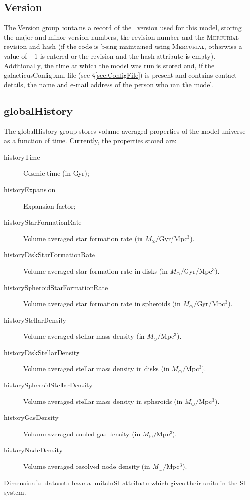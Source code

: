 \subsection{Version}

The {\normalfont \ttfamily Version} group contains a record of the \glc\ version used for this model, storing the major and minor version numbers, the revision number and the {\normalfont \scshape Mercurial} revision and hash (if the code is being maintained using {\normalfont \scshape Mercurial}, otherwise a value of $-1$ is entered or the revision and the hash attribute is empty). Additionally, the time at which the model was run is stored and, if the {\normalfont \ttfamily galacticusConfig.xml} file (see \S\ref{sec:ConfigFile}) is present and contains contact details, the name and e-mail address of the person who ran the model.

\subsection{globalHistory}\label{sec:globalHistory}

The {\normalfont \ttfamily globalHistory} group stores volume averaged properties of the model universe as a function of time. Currently, the properties stored are:
\begin{description}
 \item[{\normalfont \ttfamily historyTime}] Cosmic time (in Gyr);
 \item[{\normalfont \ttfamily historyExpansion}] Expansion factor;
 \item[{\normalfont \ttfamily historyStarFormationRate}] Volume averaged star formation rate (in $M_\odot/$Gyr/Mpc$^3$).
 \item[{\normalfont \ttfamily historyDiskStarFormationRate}] Volume averaged star formation rate in disks (in $M_\odot/$Gyr/Mpc$^3$).
 \item[{\normalfont \ttfamily historySpheroidStarFormationRate}] Volume averaged star formation rate in spheroids (in $M_\odot/$Gyr/Mpc$^3$).
 \item[{\normalfont \ttfamily historyStellarDensity}] Volume averaged stellar mass density (in $M_\odot/$Mpc$^3$).
 \item[{\normalfont \ttfamily historyDiskStellarDensity}] Volume averaged stellar mass density in disks (in $M_\odot/$Mpc$^3$).
 \item[{\normalfont \ttfamily historySpheroidStellarDensity}] Volume averaged stellar mass density in spheroids (in $M_\odot/$Mpc$^3$).
 \item[{\normalfont \ttfamily historyGasDensity}] Volume averaged cooled gas density (in $M_\odot/$Mpc$^3$).
 \item[{\normalfont \ttfamily historyNodeDensity}] Volume averaged resolved node density (in $M_\odot/$Mpc$^3$).
\end{description}
Dimensionful datasets have a {\normalfont \ttfamily unitsInSI} attribute which gives their units in the SI system.

